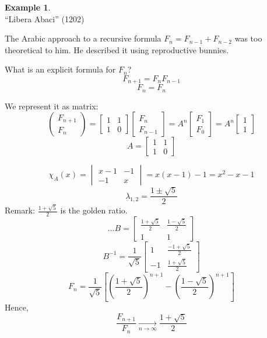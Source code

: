 \documentclass[a4paper,landscape,twocolumn]{article}
\theoremstyle{definition}
\newtheorem{ex}{Example}
\begin{document}
\begin{ex}
   \\
  \enquote{Libera Abaci} (1202)

  The Arabic approach to a recursive formula $F_n = F_{n-1} + F_{n-2}$ was too theoretical to him.
  He described it using reproductive bunnies.

  What is an explicit formula for $F_n$?
  \[ F_{n+1} = F_{n} F_{n-1} \]
  \[ F_{n} = F_{n} \]

  We represent it as matrix:
  \[
    \begin{pmatrix} F_{n+1} \\ F_n \end{pmatrix}
      = \begin{bmatrix} 1 & 1 \\ 1 & 0 \end{bmatrix} \begin{bmatrix} F_n \\ F_{n-1} \end{bmatrix}
      = A^n \begin{bmatrix} F_1 \\ F_0 \end{bmatrix} = A^n \begin{bmatrix} 1 \\ 1 \end{bmatrix}
  \] \[
    A = \begin{bmatrix} 1 & 1 \\ 1 & 0 \end{bmatrix}
  \]

  \[
    \chi_A(x) = \begin{vmatrix}
      x-1 & -1 \\
      -1 & x
    \end{vmatrix} = x (x - 1) - 1 = x^2 - x - 1
  \] \[
    \lambda_{1,2} = \frac{1 \pm \sqrt{5}}{2}
  \]
  Remark: $\frac{1 + \sqrt{5}}{2}$ is the golden ratio.
  \[
    \ldots
    B = \begin{bmatrix}
      \frac{1 + \sqrt{5}}{2} & \frac{1 - \sqrt{5}}{2} \\
      1 & 1
    \end{bmatrix}
  \] \[
    B^{-1} = \frac{1}{\sqrt{5}}
    \begin{bmatrix}
      1 & \frac{-1 + \sqrt{5}}{2} \\
      -1 & \frac{1 + \sqrt{5}}{2}
    \end{bmatrix}
  \] \[
    F_n = \frac{1}{\sqrt{5}} \left[
      \left(\frac{1 + \sqrt{5}}{2}\right)^{n+1} - \left(\frac{1 - \sqrt{5}}{2}\right)^{n+1}
    \right]
  \]
  Hence,
  \[ \frac{F_{n+1}}{F_n} \underset{n\to\infty}{\longrightarrow} \frac{1 + \sqrt{5}}{2} \]
\end{ex}

\clearpage
\begin{otherlanguage}{ngerman}
\printindex[German]
\end{otherlanguage}
\printindex[English]
\end{document}
